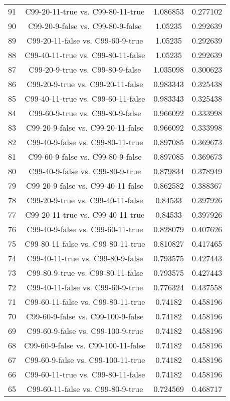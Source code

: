 \documentclass[a4paper,10pt]{article}
\begin{document}
\begin{landscape}
\begin{table}[!htp]
\begin{tabular}{cccc}
91&C99-20-11-true vs. C99-80-11-true&1.086853&0.277102\\
90&C99-20-9-false vs. C99-80-9-false&1.05235&0.292639\\
89&C99-20-11-false vs. C99-60-9-true&1.05235&0.292639\\
88&C99-40-11-true vs. C99-80-11-false&1.05235&0.292639\\
87&C99-20-9-true vs. C99-80-9-false&1.035098&0.300623\\
86&C99-20-9-true vs. C99-20-11-false&0.983343&0.325438\\
85&C99-40-11-true vs. C99-60-11-false&0.983343&0.325438\\
84&C99-60-9-true vs. C99-80-9-false&0.966092&0.333998\\
83&C99-20-9-false vs. C99-20-11-false&0.966092&0.333998\\
82&C99-40-9-false vs. C99-80-11-true&0.897085&0.369673\\
81&C99-60-9-false vs. C99-80-9-false&0.897085&0.369673\\
80&C99-40-9-false vs. C99-80-9-true&0.879834&0.378949\\
79&C99-20-9-false vs. C99-40-11-false&0.862582&0.388367\\
78&C99-20-9-true vs. C99-40-11-false&0.84533&0.397926\\
77&C99-20-11-true vs. C99-40-11-true&0.84533&0.397926\\
76&C99-40-9-false vs. C99-60-11-true&0.828079&0.407626\\
75&C99-80-11-false vs. C99-80-11-true&0.810827&0.417465\\
74&C99-40-11-true vs. C99-80-9-false&0.793575&0.427443\\
73&C99-80-9-true vs. C99-80-11-false&0.793575&0.427443\\
72&C99-40-11-false vs. C99-60-9-true&0.776324&0.437558\\
71&C99-60-11-false vs. C99-80-11-true&0.74182&0.458196\\
70&C99-60-9-false vs. C99-100-9-false&0.74182&0.458196\\
69&C99-60-9-false vs. C99-100-9-true&0.74182&0.458196\\
68&C99-60-9-false vs. C99-100-11-false&0.74182&0.458196\\
67&C99-60-9-false vs. C99-100-11-true&0.74182&0.458196\\
66&C99-60-11-true vs. C99-80-11-false&0.74182&0.458196\\
65&C99-60-11-false vs. C99-80-9-true&0.724569&0.468717\\

\end{tabular}
\end{table}
\end{landscape}
\end{document}
